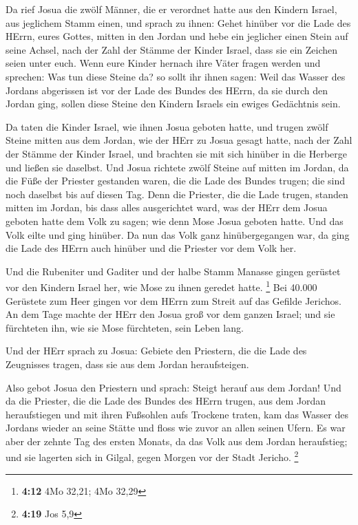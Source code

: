  Da rief Josua die zwölf Männer, die er verordnet hatte aus
den Kindern Israel, aus jeglichem Stamm einen,  und sprach
zu ihnen: Gehet hinüber vor die Lade des HErrn, eures Gottes, mitten in
den Jordan und hebe ein jeglicher einen Stein auf seine Achsel, nach der
Zahl der Stämme der Kinder Israel,  dass sie ein Zeichen
seien unter euch. Wenn eure Kinder hernach ihre Väter fragen werden und
sprechen: Was tun diese Steine da?  so sollt ihr ihnen
sagen: Weil das Wasser des Jordans abgerissen ist vor der Lade des
Bundes des HErrn, da sie durch den Jordan ging, sollen diese Steine den
Kindern Israels ein ewiges Gedächtnis sein.

 Da taten die Kinder Israel, wie ihnen Josua geboten hatte,
und trugen zwölf Steine mitten aus dem Jordan, wie der HErr zu Josua
gesagt hatte, nach der Zahl der Stämme der Kinder Israel, und brachten
sie mit sich hinüber in die Herberge und ließen sie daselbst.
 Und Josua richtete zwölf Steine auf mitten im Jordan, da
die Füße der Priester gestanden waren, die die Lade des Bundes trugen;
die sind noch daselbst bis auf diesen Tag.  Denn die
Priester, die die Lade trugen, standen mitten im Jordan, bis dass alles
ausgerichtet ward, was der HErr dem Josua geboten hatte dem Volk zu
sagen; wie denn Mose Josua geboten hatte. Und das Volk eilte und ging
hinüber.  Da nun das Volk ganz hinübergegangen war, da ging
die Lade des HErrn auch hinüber und die Priester vor dem Volk her.

 Und die Rubeniter und Gaditer und der halbe Stamm Manasse
gingen gerüstet vor den Kindern Israel her, wie Mose zu ihnen geredet
hatte. \footnote{\textbf{4:12} 4Mo 32,21; 4Mo 32,29}  Bei
40.000 Gerüstete zum Heer gingen vor dem HErrn zum Streit auf das
Gefilde Jerichos.  An dem Tage machte der HErr den Josua
groß vor dem ganzen Israel; und sie fürchteten ihn, wie sie Mose
fürchteten, sein Leben lang.

 Und der HErr sprach zu Josua:  Gebiete den
Priestern, die die Lade des Zeugnisses tragen, dass sie aus dem Jordan
heraufsteigen.

 Also gebot Josua den Priestern und sprach: Steigt herauf
aus dem Jordan!  Und da die Priester, die die Lade des
Bundes des HErrn trugen, aus dem Jordan heraufstiegen und mit ihren
Fußsohlen aufs Trockene traten, kam das Wasser des Jordans wieder an
seine Stätte und floss wie zuvor an allen seinen Ufern.  Es
war aber der zehnte Tag des ersten Monats, da das Volk aus dem Jordan
heraufstieg; und sie lagerten sich in Gilgal, gegen Morgen vor der Stadt
Jericho. \footnote{\textbf{4:19} Jos 5,9}

